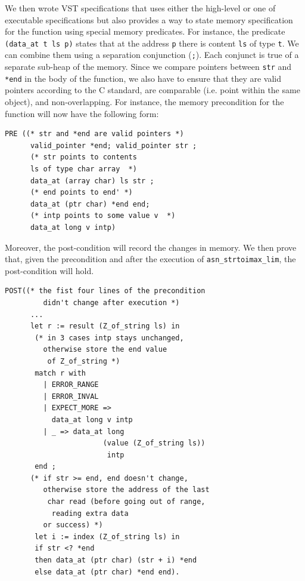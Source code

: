 \documentclass[10p,conference]{IEEEtran}
\begin{document}
 We then wrote VST specifications that uses either the high-level
 or one of executable specifications but also provides a way to
 state memory specification for the function using special memory
 predicates. For instance, the predicate \texttt{(data\_at t ls p)}
 states that at the address \texttt{p} there is content \texttt{ls} of
 type \texttt{t}. We can combine them using a separation conjunction
 (\texttt{;}). Each conjunct is true of a separate sub-heap of the
 memory. Since we compare pointers between \texttt{str} and \texttt{*end} in the body of the function, we also have to ensure
 that they are valid pointers according to the C standard, are
 comparable (i.e. point within the same object), and non-overlapping. For instance, the
 memory precondition for the function will now have the following form:
\begin{lstlisting}[language=Coq]
PRE ((* str and *end are valid pointers *)
      valid_pointer *end; valid_pointer str ;
      (* str points to contents 
      ls of type char array  *)
      data_at (array char) ls str ; 
      (* end points to end' *)
      data_at (ptr char) *end end;
      (* intp points to some value v  *)
      data_at long v intp)
     \end{lstlisting}

     Moreover, the post-condition will record the changes in memory. We then
     prove that, given the precondition and after the execution of
     \texttt{asn\_strtoimax\_lim}, the post-condition will hold.
           
\begin{lstlisting}[language=Coq]
 POST((* the fist four lines of the precondition 
         didn't change after execution *)
      ... 
      let r := result (Z_of_string ls) in
       (* in 3 cases intp stays unchanged,
         otherwise store the end value
          of Z_of_string *)
       match r with 
         | ERROR_RANGE 
         | ERROR_INVAL 
         | EXPECT_MORE => 
           data_at long v intp
         | _ => data_at long 
                       (value (Z_of_string ls))
                        intp 
       end ;
      (* if str >= end, end doesn't change, 
         otherwise store the address of the last
          char read (before going out of range,
           reading extra data 
         or success) *)
       let i := index (Z_of_string ls) in
       if str <? *end
       then data_at (ptr char) (str + i) *end
       else data_at (ptr char) *end end).
\end{lstlisting}
\end{document}
